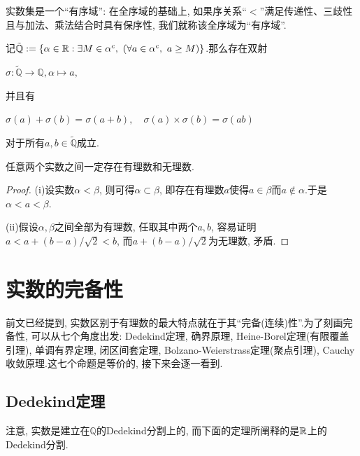 实数集是一个“有序域”: 在全序域的基础上, 如果序关系“$<$”满足传递性、三歧性且与加法、乘法结合时具有保序性, 我们就称该全序域为“有序域”. 

\begin{proposition}{}
	记$\tilde{\mathbb{Q}}: =\{ \alpha \in \mathbb{R} :  \exists M \in \alpha ^c, ~(\forall a \in \alpha ^c, ~a \geq M) \}$.那么存在双射
	\begin{center}
		$\sigma : \tilde{\mathbb{Q}} \to \mathbb{Q}, \alpha \mapsto a, $
	\end{center}
	并且有
	\begin{center}
		$\sigma (a) + \sigma (b) = \sigma (a + b), \quad \sigma (a) \times \sigma (b) = \sigma (ab)$
	\end{center}
	对于所有$a , b \in \tilde{\mathbb{Q}}$成立.
\end{proposition}

\begin{corollary}{}
	任意两个实数之间一定存在有理数和无理数.
\end{corollary}
\begin{proof}
	(i)设实数$\alpha < \beta$, 则可得$\alpha \subset \beta$, 即存在有理数$a$使得$a \in \beta$而$a \notin \alpha$.于是$\alpha < a < \beta$. 
	
	(ii)假设$\alpha , \beta$之间全部为有理数, 任取其中两个$a, b$, 容易证明$a<a+(b-a)/\sqrt{2}<b$, 而$a+(b-a)/\sqrt{2}$为无理数, 矛盾.
\end{proof}



\newpage
\section{实数的完备性}

前文已经提到, 实数区别于有理数的最大特点就在于其“完备(连续)性”.为了刻画完备性, 可以从七个角度出发: Dedekind定理, 确界原理, Heine-Borel定理(有限覆盖引理), 单调有界定理, 闭区间套定理, Bolzano-Weierstrass定理(聚点引理), Cauchy收敛原理.这七个命题是等价的, 接下来会逐一看到.

\subsection{Dedekind定理}

注意, 实数是建立在$\mathbb{Q}$的Dedekind分割上的, 而下面的定理所阐释的是$\mathbb{R}$上的Dedekind分割.

